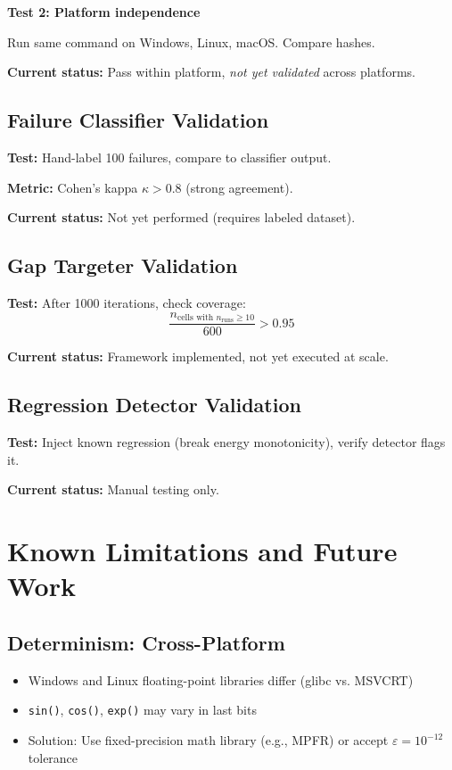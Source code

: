 \documentclass[11pt]{article}
\begin{document}
\textbf{Test 2: Platform independence}

Run same command on Windows, Linux, macOS. Compare hashes.

\textbf{Current status:} Pass within platform, \textit{not yet validated} across platforms.

\subsection{Failure Classifier Validation}

\textbf{Test:} Hand-label 100 failures, compare to classifier output.

\textbf{Metric:} Cohen's kappa $\kappa > 0.8$ (strong agreement).

\textbf{Current status:} Not yet performed (requires labeled dataset).

\subsection{Gap Targeter Validation}

\textbf{Test:} After 1000 iterations, check coverage:
\begin{equation}
\frac{n_{\text{cells with } n_{\text{runs}} \geq 10}}{600} > 0.95
\end{equation}

\textbf{Current status:} Framework implemented, not yet executed at scale.

\subsection{Regression Detector Validation}

\textbf{Test:} Inject known regression (break energy monotonicity), verify detector flags it.

\textbf{Current status:} Manual testing only.

\section{Known Limitations and Future Work}

\subsection{Determinism: Cross-Platform}

\begin{itemize}
\item Windows and Linux floating-point libraries differ (glibc vs. MSVCRT)
\item \texttt{sin()}, \texttt{cos()}, \texttt{exp()} may vary in last bits
\item Solution: Use fixed-precision math library (e.g., MPFR) or accept $\varepsilon = 10^{-12}$ tolerance
\end{itemize}
\end{document}
